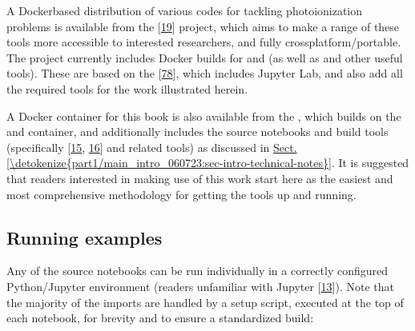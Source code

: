 \documentclass[letterpaper,table,10pt,english]{jupyterBook}
\begin{document}
\sphinxAtStartPar
A Docker\sphinxhyphen{}based distribution of various codes for tackling
photoionization problems is available from the  {[}\hyperlink{cite.backmatter/bibliography:id685}{19}{]}
project, which aims to make a range of these tools more accessible to
interested researchers, and fully cross\sphinxhyphen{}platform/portable. The project currently includes Docker builds for  and  (as well as  and other useful tools). These are based on the  {[}\hyperlink{cite.backmatter/bibliography:id711}{78}{]}, which includes Jupyter Lab, and also add all the required tools for the work illustrated herein.

\sphinxAtStartPar
A Docker container for this book is also available from the , which builds on the  and  container, and additionally includes the source notebooks and build tools (specifically  {[}\hyperlink{cite.backmatter/bibliography:id710}{15}, \hyperlink{cite.backmatter/bibliography:id564}{16}{]} and related tools) as discussed in  \hyperref[\detokenize{part1/main_intro_060723:sec-intro-technical-notes}]{Sect.\@ \ref{\detokenize{part1/main_intro_060723:sec-intro-technical-notes}}}. It is suggested that readers interested in making use of this work start here as the easiest \sphinxhyphen{} and most comprehensive \sphinxhyphen{} methodology for getting the tools up and running.


\subsection{Running examples}
\label{\detokenize{part1/platform_intro_070723:running-examples}}
\sphinxAtStartPar
Any of the source notebooks can be run individually in a correctly configured Python/Jupyter environment (readers unfamiliar with Jupyter  {[}\hyperlink{cite.backmatter/bibliography:id826}{13}{]}). Note that the majority of the imports are handled by a setup script, executed at the top of each notebook, for brevity and to ensure a standardized build:
\end{document}
